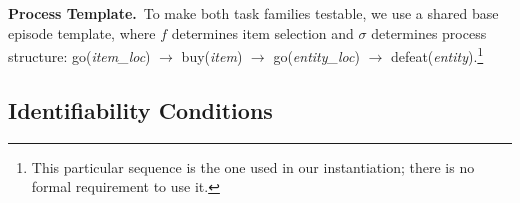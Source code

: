 \documentclass[11pt]{article}
\newcommand\jl[1]{\todo[color=blue!40]{{\bf Jessy}: #1}}
\begin{document}

  \noindent\textbf{Process Template.}~To make both task families testable, we use a shared base episode template, where $f$ determines item selection and $\sigma$ determines process structure: go(\textit{item\_loc}) $\to$ buy(\textit{item}) $\to$ go(\textit{entity\_loc}) $\to$ defeat(\textit{entity}).\footnote{This particular sequence is the one used in our instantiation; there is no formal requirement to use it.}

\subsection{Identifiability Conditions}
\label{sec:identifiability}
\end{document}
